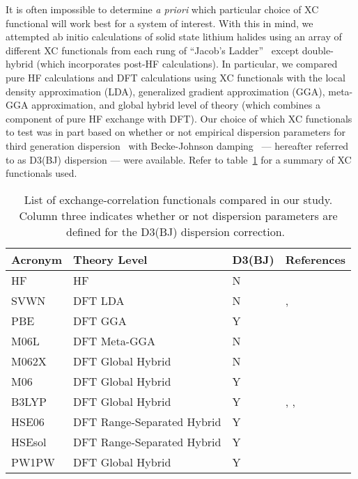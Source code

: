 \documentclass[titlepage,11pt]{article}
\begin{document}
It is often impossible to determine \textit{a priori} which particular choice of XC functional will work best for a system of interest. With this in mind, we attempted ab initio calculations of solid state lithium halides using an array of different XC functionals from each rung of ``Jacob's Ladder''~\cite{Mardirossian2017} except double-hybrid (which incorporates post-HF calculations). In particular, we compared pure HF calculations and DFT calculations using XC functionals with the local density approximation (LDA), generalized gradient approximation (GGA), meta-GGA approximation, and global hybrid level of theory (which combines a component of pure HF exchange with DFT). Our choice of which XC functionals to test was in part based on whether or not empirical dispersion parameters for third generation dispersion~\cite{Grimme2010,grimme2016dispersion} with Becke-Johnson damping~\cite{Becke2007,Grimme2011} --- hereafter referred to as D3(BJ) dispersion --- were available. Refer to table~\ref{tab:XC} for a summary of XC functionals used.
%
\begin{table}[]
	\centering
	\begin{tabular}{llll}
		\hline
		\textbf{Acronym} & \textbf{Theory Level} & \textbf{D3(BJ)} & \textbf{References} \\ \hline
		\multicolumn{1}{l|}{HF} & HF & N &  \\
		\multicolumn{1}{l|}{SVWN} & DFT LDA & N & \citenum{dirac_1930}, \citenum{Vosko1980} \\
		\multicolumn{1}{l|}{PBE} & DFT GGA & Y & \citenum{Perdew1996} \\
		\multicolumn{1}{l|}{M06L} & DFT Meta-GGA & N & \citenum{Zhao2006} \\
		\multicolumn{1}{l|}{M062X} & DFT Global Hybrid & N & \citenum{Zhao2008} \\
		\multicolumn{1}{l|}{M06} & DFT Global Hybrid & Y & \citenum{Zhao2008} \\
		\multicolumn{1}{l|}{B3LYP} & DFT Global Hybrid & Y & \citenum{Becke1993}, \citenum{becke1988}, \citenum{lee1988} \\
		\multicolumn{1}{l|}{HSE06} & DFT Range-Separated Hybrid & Y & \citenum{krukau2006} \\
		\multicolumn{1}{l|}{HSEsol} & DFT Range-Separated Hybrid & Y & \citenum{schimka2011} \\
		\multicolumn{1}{l|}{PW1PW} & DFT Global Hybrid & Y & \citenum{PW1PW} \\
		\hline
	\end{tabular}
	\caption{\label{tab:XC} List of exchange-correlation functionals compared in our study. Column three indicates whether or not dispersion parameters are defined for the D3(BJ) dispersion correction.~\cite{Grimme2010,grimme2016dispersion}}
\end{table}
\end{document}
